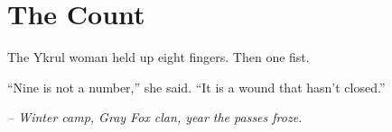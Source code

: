 \chapter*{The Count}

The Ykrul woman held up eight fingers. Then one fist.

``Nine is not a number,'' she said. ``It is a wound that hasn't closed.''

\smallskip

\noindent \textit{-- Winter camp, Gray Fox clan, year the passes froze.}

